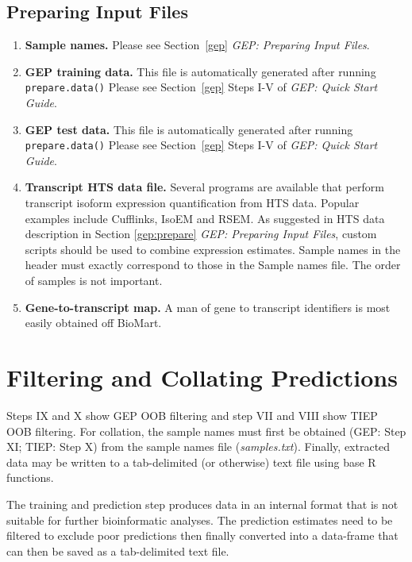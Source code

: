 \documentclass[a4paper,12pt]{article}
\begin{document}
\subsection{Preparing Input Files}
\label{tiep:prepare}
\begin{enumerate}
\item \textbf{Sample names.} Please see Section~\ref{gep} \textit{GEP: Preparing Input Files}.

\item \textbf{GEP training data.} This file is automatically generated after running \texttt{prepare.data()} Please see Section~\ref{gep} Steps I-V of \textit{GEP: Quick Start Guide}.

\item \textbf{GEP test data.} This file is automatically generated after running \texttt{prepare.data()} Please see Section~\ref{gep} Steps I-V of \textit{GEP: Quick Start Guide}.

\item \textbf{Transcript HTS data file.} Several programs are available that perform transcript isoform expression quantification from HTS data. Popular examples include \textsf{Cufflinks}, \textsf{IsoEM} and \textsf{RSEM}. As suggested in HTS data description in Section \ref{gep:prepare} \textit{GEP: Preparing Input Files}, custom scripts should be used to combine expression estimates. Sample names in the header must exactly correspond to those in the Sample names file. The order of samples is not important.

\item \textbf{Gene-to-transcript map.} A man of gene to transcript identifiers is most easily obtained off \textsf{BioMart}.
\end{enumerate}

\section{Filtering and Collating Predictions}
\label{filtering}
Steps IX and X show GEP OOB filtering and step VII and VIII show TIEP OOB filtering. For collation, the sample names must first be obtained (GEP: Step XI; TIEP: Step X) from the sample names file (\textit{samples.txt}). Finally, extracted data may be written to a tab-delimited (or otherwise) text file using base \textsf{R} functions.

The training and prediction step produces data in an internal format that is not suitable for further bioinformatic analyses. The prediction estimates need to be filtered to exclude poor predictions then finally converted into a data-frame that can then be saved as a tab-delimited text file.
\end{document}

